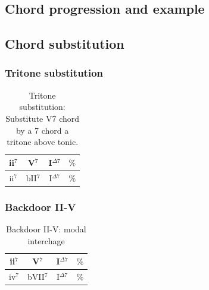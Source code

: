 \documentclass{article}
\begin{document}
\subsection{Chord progression and example}



\subsection{Chord substitution}

\subsubsection{Tritone substitution}
\begin{table}[!h]
	\caption{Tritone substitution: Substitute V7 chord by a 7 chord a tritone above tonic.}
	\centering
	\begin{tabular}{| c | c | c | c |}
		\hline
		\phantom{x}ii$^7$\phantom{x} & \phantom{x}V$^7$\phantom{x} & \phantom{x}I$^{\Delta 7}$\phantom{x}  & \phantom{x}$\%$\phantom{x} \\
		\hline
		\phantom{x}ii$^7$\phantom{x} & \phantom{x}bII$^7$\phantom{x} & \phantom{x}I$^{\Delta 7}$\phantom{x}  & \phantom{x}$\%$\phantom{x} \\
		\hline
	\end{tabular}
	\label{tab:tritone-subs }
\end{table}

\subsubsection{Backdoor II-V}
\begin{table}[!h]
	\caption{Backdoor II-V: modal interchage}
	\centering
	\begin{tabular}{| c | c | c | c |}
		\hline
		\phantom{x}ii$^7$\phantom{x} & \phantom{x}V$^7$\phantom{x} & \phantom{x}I$^{\Delta 7}$\phantom{x}  & \phantom{x}$\%$\phantom{x} \\
		\hline
		\phantom{x}iv$^7$\phantom{x} & \phantom{x}bVII$^7$\phantom{x} & \phantom{x}I$^{\Delta 7}$\phantom{x}  & \phantom{x}$\%$\phantom{x} \\
		\hline
	\end{tabular}
	\label{tab: }
\end{table}
\end{document}
